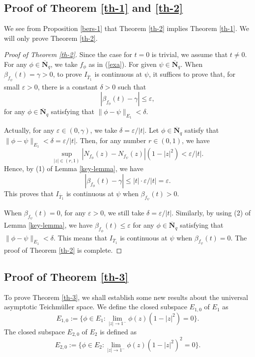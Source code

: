\documentclass[11pt]{amsart}
\theoremstyle{remark}
\theoremstyle{claim}
\theoremstyle{definition}
\theoremstyle{problem}
\theoremstyle{conjecture}
\theoremstyle{question}
\numberwithin{equation}{section}
\begin{document}
\subsection{Proof of Theorem \ref{th-1} and \ref{th-2}}
We see from Proposition \ref{bers-1} that Theorem \ref{th-2} implies Theorem \ref{th-1}.  We will only prove Theorem \ref{th-2}.
\begin{proof}[Proof of Theorem \ref{th-2}]
Since the case for $t=0$ is trivial, we assume that $t\neq0$.  For any $\phi\in \overline{\mathbf{N}}_q$, we take $f_{\phi}$ as in (\ref{exa}). For given $\psi\in  \overline{\mathbf{N}}_q$. When $\beta_{f_{\psi}}(t)=\gamma>0$,  to prove $I_{\overline{T}_1}$ is continuous at $\psi$,  it suffices to prove that, for small $\varepsilon>0$, there is a constant $\delta>0$ such that $$|\beta_{f_{\phi}}(t)-\gamma|\leq \varepsilon,$$
for any $\phi \in\overline{\mathbf{N}}_q$ satisfying that  $\|\phi-\psi\|_{E_1}<\delta$.

Actually,  for any $\varepsilon\in (0, \gamma)$, we take $\delta=\varepsilon/|t|$. Let $\phi \in\overline{\mathbf{N}}_q$ satisfy that $\|\phi-\psi\|_{E_1}<\delta=\varepsilon/|t|$. Then, for  any number $r\in (0,1)$, we have
\begin{equation}
\sup\limits_{|z|\in (r,1)} |N_{f_{\phi}}(z)-N_{{f}_{\psi}}(z)|(1-|z|^2)<\varepsilon/|t|.\nonumber
\end{equation}
Hence, by (1) of Lemma \ref{key-lemma}, we have
$$|\beta_{f_{\phi}}(t)-\gamma|\leq |t|\cdot\varepsilon/|t|=\varepsilon.$$
This proves that $I_{\overline{T}_1}$ is continuous at $\psi$ when $\beta_{f_{\psi}}(t)>0$.

When $\beta_{f_{\psi}}(t)=0$, for any $\varepsilon>0$, we still take $\delta=\varepsilon/|t|$. Similarly, by using (2) of Lemma \ref{key-lemma}, we have $\beta_{f_{\phi}}(t)\leq \varepsilon$ for any $\phi \in\overline{\mathbf{N}}_q$ satisfying that  $\|\phi-\psi\|_{E_1}<\delta$.  This means that $I_{\overline{T}_1}$ is continuous at $\psi$ when $\beta_{f_{\psi}}(t)=0$. The proof of Theorem \ref{th-2} is complete.   \end{proof}

\subsection{Proof of Theorem \ref{th-3}} To prove Theorem \ref{th-3}, we shall establish some new results about the universal asymptotic Teichm\"uller space. We define the closed subspace $E_{1, 0}$ of $E_1$ as
$$E_{1,0}:=\{\phi\in E_1: \lim\limits_{|z|\rightarrow 1^{-}}\phi(z)(1-|z|^2)=0\}.$$
The closed subspace $E_{2,0}$ of $E_2$ is defined as
$$E_{2,0}:=\{\phi\in E_2: \lim\limits_{|z|\rightarrow 1^{-}}\phi(z)(1-|z|^2)^2=0\}.$$
\end{document}
